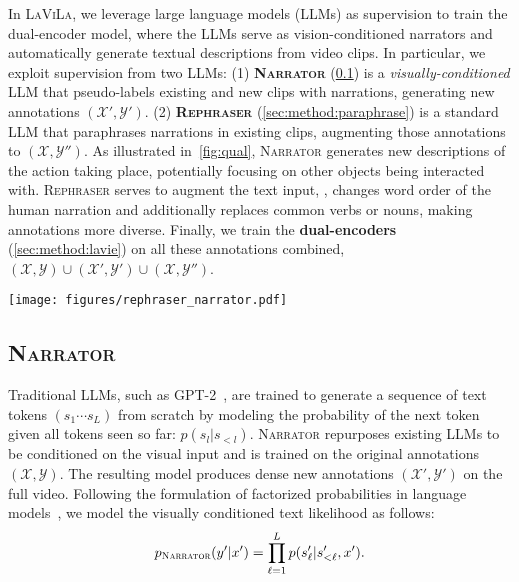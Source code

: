 \documentclass[10pt,twocolumn,letterpaper]{article}
\newcommand{\calX}{\mathcal{X}}
\newcommand{\calY}{\mathcal{Y}}
\newcommand{\ours}{\textsc{LaViLa}\xspace}
\newcommand{\narrator}{\textsc{Narrator}\xspace}
\newcommand{\rephraser}{\textsc{Rephraser}\xspace}
\begin{document}
In \ours, we leverage large language models (LLMs) as supervision to train the dual-encoder model, where the LLMs serve as vision-conditioned narrators and automatically generate textual descriptions from video clips.
In particular, we exploit supervision from two LLMs:
(1) {\bf \narrator} (\cref{sec:method:pseudo_caption}) is a {\em visually-conditioned} LLM that pseudo-labels existing and new clips with narrations, generating new annotations $(\calX', \calY')$.
(2) {\bf \rephraser} (\cref{sec:method:paraphrase}) is a standard LLM that paraphrases narrations in existing clips, augmenting those annotations to $(\calX, \calY'')$.
As illustrated in~\cref{fig:qual}, \narrator generates new descriptions of the action taking place, potentially focusing on other objects being interacted with.
\rephraser serves to augment the text input, \eg, changes word order of the human narration and additionally replaces common verbs or nouns, making annotations more diverse.
Finally, we train the {\bf dual-encoders} (\cref{sec:method:lavie}) on all these annotations combined,
\ie $(\calX, \calY) \cup (\calX', \calY') \cup (\calX, \calY'')$.




\begin{figure*}[t]
	\vspace{-10pt}
	\centering
	\texttt{[image: figures/rephraser\_narrator.pdf]}
	\caption{{\bf Language supervision from \rephraser and \narrator}.
	\rephraser {\em (left)} takes the narration as input, passes it through a text encoder and uses a text decoder to autoregressively generate the rephrased output.
	\narrator {\em (right)} takes video frames as input and obtains the visual embeddings through a video encoder followed by attentional pooling. Equipped with a few additional cross-attention modules, the text decoder autoregressively generates new narrations for those new frames.}
	\label{fig:method}
\end{figure*}

\subsection{\bf \narrator}
\label{sec:method:pseudo_caption}




Traditional LLMs, such as GPT-2~\cite{radford2019gpt2}, are trained to generate a sequence of text tokens $(s_1\cdots\!s_{L})$ from scratch by modeling the probability of the next token given all tokens seen so far: $p(s_l | s_{<l})$.
\narrator repurposes existing LLMs to be conditioned on the visual input and is trained on the original annotations $(\calX, \calY)$. The resulting model produces dense new annotations $(\calX', \calY')$ on the full video.
Following the formulation of factorized probabilities in language models~\cite{bengio2020neural}, we model the visually conditioned text likelihood as follows:
{\small
\begin{align}
	\label{eq:vlm}
	p_\mathrm{\narrator}(y' \vert x') = \prod_{\ell=1}^L p(s'_\ell | s'_{<\ell} , x').
\end{align}
}
\end{document}
